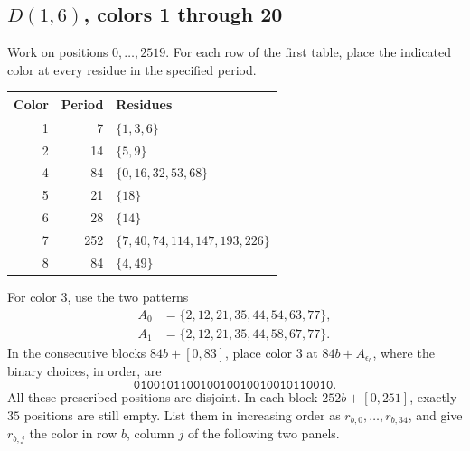 \documentclass[11pt,reqno]{amsart}
\theoremstyle{plain}
\newcommand{\D}[1]{D(1,#1)}
\theoremstyle{plain}
\theoremstyle{plain}
\begin{document}
\subsection*{\texorpdfstring{$\D{6}$}{D(1,6)}, colors 1 through 20}
Work on positions $0,\ldots,2519$. For each row of the first table,
place the indicated color at every residue in the specified period.
\begin{center}
\begin{tabular}{rrl}
\toprule
Color & Period & Residues \\
\midrule
1 & 7 & $\{1,3,6\}$ \\
2 & 14 & $\{5,9\}$ \\
4 & 84 & $\{0,16,32,53,68\}$ \\
5 & 21 & $\{18\}$ \\
6 & 28 & $\{14\}$ \\
7 & 252 & $\{7,40,74,114,147,193,226\}$ \\
8 & 84 & $\{4,49\}$ \\
\bottomrule
\end{tabular}
\end{center}
For color $3$, use the two patterns
\begin{align*}
A_0&=\{2,12,21,35,44,54,63,77\},\\
A_1&=\{2,12,21,35,44,58,67,77\}.
\end{align*}
In the consecutive blocks $84b+[0,83]$, place color $3$ at $84b+A_{\epsilon_b}$,
where the binary choices, in order, are
\[
\texttt{010010110010010010010010110010}.
\]
All these prescribed positions are disjoint. In each block
$252b+[0,251]$, exactly $35$ positions are still empty. List them in
increasing order as $r_{b,0},\ldots,r_{b,34}$, and give $r_{b,j}$ the
color in row $b$, column $j$ of the following two panels.
\end{document}
